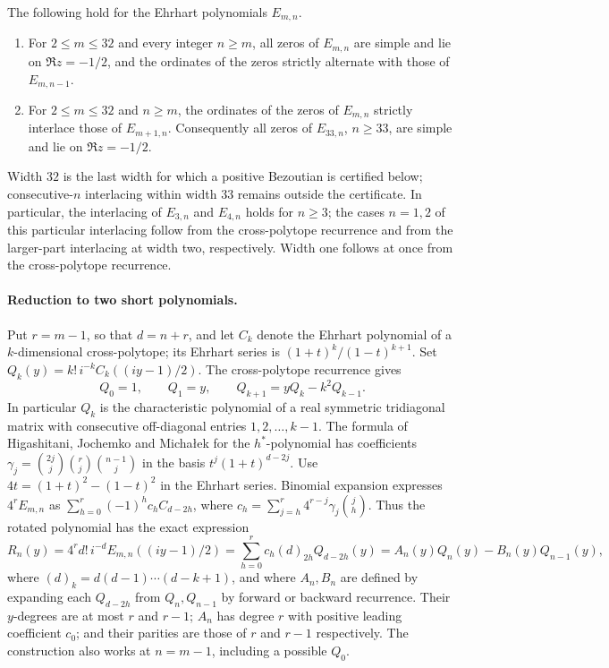 \begin{theorem}\label{gra:thm:ehrhart}
The following hold for the Ehrhart polynomials $E_{m,n}$.
\begin{enumerate}[label=\textup{(\alph*)}]
\item For $2\le m\le32$ and every integer $n\ge m$, all zeros of $E_{m,n}$
are simple and lie on $\Re z=-1/2$, and the ordinates of the zeros
strictly alternate with those of $E_{m,n-1}$.
\item For $2\le m\le32$ and $n\ge m$, the ordinates of the zeros of
$E_{m,n}$ strictly interlace those of $E_{m+1,n}$. Consequently all zeros
of $E_{33,n}$, $n\ge33$, are simple and lie on $\Re z=-1/2$.
\end{enumerate}
\end{theorem}

Width $32$ is the last width for which a positive Bezoutian is certified
below; consecutive-$n$ interlacing within width $33$ remains outside the
certificate. In particular, the interlacing of $E_{3,n}$ and $E_{4,n}$
holds for $n\ge3$; the cases $n=1,2$ of this particular interlacing follow
from the cross-polytope recurrence and from the larger-part interlacing at
width two, respectively. Width one follows at once from the cross-polytope
recurrence.

\paragraph{Reduction to two short polynomials.}
Put $r=m-1$, so that $d=n+r$, and let $C_k$ denote the Ehrhart polynomial
of a $k$-dimensional cross-polytope; its Ehrhart series is
$(1+t)^k/(1-t)^{k+1}$. Set $Q_k(y)=k!\,i^{-k}C_k((iy-1)/2)$. The
cross-polytope recurrence gives
\[
 Q_0=1,\qquad Q_1=y,\qquad Q_{k+1}=yQ_k-k^2Q_{k-1}.
\]
In particular $Q_k$ is the characteristic polynomial of a real symmetric
tridiagonal matrix with consecutive off-diagonal entries $1,2,\dots,k-1$.
The formula of Higashitani, Jochemko and Micha\l{}ek for the
$h^*$-polynomial
\cite[Theorem~4.1]{HigashitaniJochemkoMichalek2018Hstar} has
coefficients $\gamma_j=\binom{2j}{j}\binom rj\binom{n-1}j$ in the basis
$t^j(1+t)^{d-2j}$. Use $4t=(1+t)^2-(1-t)^2$ in the Ehrhart series.
Binomial expansion expresses $4^rE_{m,n}$ as
$\sum_{h=0}^r(-1)^hc_hC_{d-2h}$, where
$c_h=\sum_{j=h}^r4^{r-j}\gamma_j\binom jh$. Thus the rotated polynomial
has the exact expression
\begin{equation}\label{gra:eq:rotated}
 R_n(y)=4^rd!\,i^{-d}E_{m,n}((iy-1)/2)
 =\sum_{h=0}^rc_h(d)_{2h}Q_{d-2h}(y)
 =A_n(y)Q_n(y)-B_n(y)Q_{n-1}(y),
\end{equation}
where $(d)_k=d(d-1)\cdots(d-k+1)$, and where $A_n,B_n$ are defined by
expanding each $Q_{d-2h}$ from $Q_n,Q_{n-1}$ by forward or backward
recurrence. Their $y$-degrees are at most $r$ and $r-1$; $A_n$ has degree
$r$ with positive leading coefficient $c_0$; and their parities are those
of $r$ and $r-1$ respectively. The construction also works at $n=m-1$,
including a possible $Q_0$.

